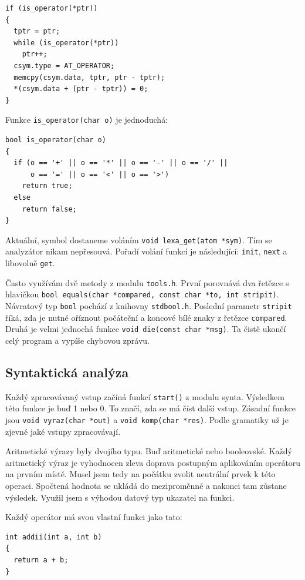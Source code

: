 \documentclass[a4paper, 12pt]{article}
\begin{document}
\begin{lstlisting}
if (is_operator(*ptr))
{
  tptr = ptr;
  while (is_operator(*ptr))
    ptr++;
  csym.type = AT_OPERATOR;
  memcpy(csym.data, tptr, ptr - tptr);
  *(csym.data + (ptr - tptr)) = 0;
}
\end{lstlisting}

Funkce \texttt{is\_operator(char o)} je jednoduchá:

\begin{lstlisting}
bool is_operator(char o)
{
  if (o == '+' || o == '*' || o == '-' || o == '/' ||
      o == '=' || o == '<' || o == '>')
    return true;
  else
    return false;
}
\end{lstlisting}

Aktuální, symbol dostaneme voláním
\verb+void lexa_get(atom *sym)+. Tím se analyzátor nikam nepřesouvá.
Pořadí volání funkcí je následující: \texttt{init}, \texttt{next} a
libovolně \texttt{get}.

Často využívám dvě metody z modulu \texttt{tools.h}. První porovnává
dva řetězce s hlavičkou
\verb+bool equals(char *compared, const char *to, int stripit)+. Návratový
typ \texttt{bool} pochází z knihovny \texttt{stdbool.h}.  Poslední
parametr \texttt{stripit} říká, zda je nutné oříznout počáteční a
koncové bílé znaky z řetězce \texttt{compared}.  Druhá je velmi
jednochá funkce \verb+void die(const char *msg)+. Ta čistě ukončí celý
program a vypíše chybovou zprávu.

\subsection{Syntaktická analýza}
Každý zpracovávaný vstup začíná funkcí \texttt{start()} z modulu
\textsf{synta}.  Výsledkem této funkce je buď 1 nebo 0. To značí, zda
se má číst další vstup.  Zásadní funkce jsou
\verb+void vyraz(char *out)+ a \verb+void komp(char *res)+. Podle
gramatiky už je zjevné jaké vstupy zpracovávají.

Aritmetické výrazy byly dvojího typu. Buď aritmetické nebo
booleovské. Každý aritmetický výraz je vyhodnocen zleva doprava
postupným aplikováním operátoru na prvním místě. Musel jsem tedy na
počátku zvolit neutrální prvek k této operaci. Spočtená hodnota se
ukládá do meziproměnné a nakonci tam zůstane výsledek.  Využil jsem s
výhodou datový typ ukazatel na funkci.

Každý operátor má svou vlastní funkci jako tato:
\begin{lstlisting}
int addii(int a, int b)
{
  return a + b;
}
\end{lstlisting}
\end{document}
